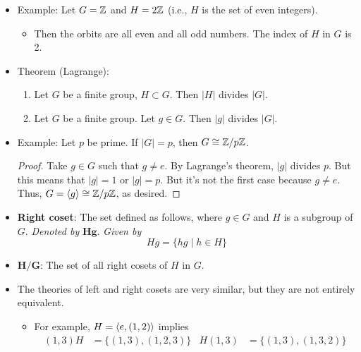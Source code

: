 \documentclass[../notes.tex]{subfiles}
\begin{document}
\begin{itemize}
    \item Example: Let $G=\mathbb{Z}$ and $H=2\mathbb{Z}$ (i.e., $H$ is the set of even integers).
    \begin{itemize}
        \item Then the orbits are all even and all odd numbers. The index of $H$ in $G$ is 2.
    \end{itemize}
    \item Theorem (Lagrange):
    \begin{enumerate}
        \item Let $G$ be a finite group, $H\subset G$. Then $|H|$ divides $|G|$.
        \item Let $G$ be a finite group. Let $g\in G$. Then $|g|$ divides $|G|$.
    \end{enumerate}
    \item Example: Let $p$ be prime. If $|G|=p$, then $G\cong\mathbb{Z}/p\mathbb{Z}$.
    \begin{proof}
        Take $g\in G$ such that $g\neq e$. By Lagrange's theorem, $|g|$ divides $p$. But this means that $|g|=1$ or $|g|=p$. But it's not the first case because $g\neq e$. Thus, $G=\left\langle{g}\right\rangle\cong\mathbb{Z}/p\mathbb{Z}$, as desired.
    \end{proof}
    \item \textbf{Right coset}: The set defined as follows, where $g\in G$ and $H$ is a subgroup of $G$. \emph{Denoted by} $\bm{Hg}$. \emph{Given by}
    \begin{equation*}
        Hg = \{hg\mid h\in H\}
    \end{equation*}
    \item $\bm{H/G}$: The set of all right cosets of $H$ in $G$.
    \item The theories of left and right cosets are very similar, but they are not entirely equivalent.
    \begin{itemize}
        \item For example, $H=\left\langle{e,(1,2)}\right\rangle$ implies
        \begin{align*}
            (1,3)H &= \{(1,3),(1,2,3)\}&
            H(1,3) &= \{(1,3),(1,3,2)\}
        \end{align*}
    \end{itemize}
\end{itemize}
\end{document}
